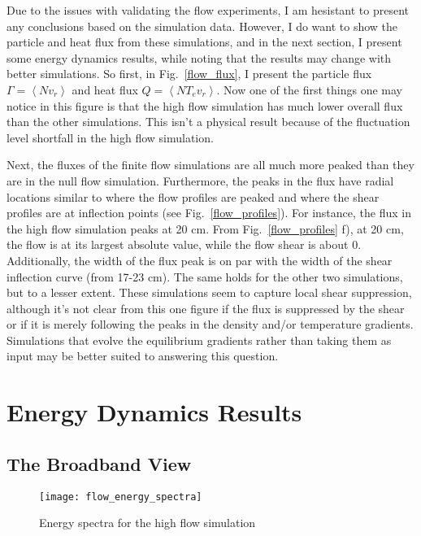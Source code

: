 Due to the issues with validating the flow experiments, I am hesistant to present any conclusions based on the simulation data. However, I do want to show the particle and heat flux from these
simulations, and in the next section, I present some energy dynamics results, while noting that the results may change with better simulations. So first, in Fig.~\ref{flow_flux}, I present
the particle flux $\Gamma = \left< N v_r \right>$ and heat flux $Q = \left< N T_e v_r \right> $. Now one of the first things one may notice in this figure is that the high flow simulation has
much lower overall flux than the other simulations. This isn't a physical result because of the fluctuation level shortfall in the high flow simulation.

Next, the fluxes of the finite flow simulations are all much more peaked than they are in the null flow simulation. Furthermore, the peaks in the flux have radial locations similar to
where the flow profiles are peaked and where the shear profiles are at inflection points (see Fig.~\ref{flow_profiles}). For instance, the flux in the high flow simulation peaks at 20 cm.
From Fig.~\ref{flow_profiles} f), at 20 cm, the flow is at its largest absolute value, while the flow shear is about 0. Additionally, the width of the flux peak is on par with the width
of the shear inflection curve (from 17-23 cm). The same holds for the other two simulations, but to a lesser extent. These simulations seem to capture local shear suppression, although it's
not clear from this one figure if the flux is suppressed by the shear or if it is merely following the peaks in the density and/or temperature gradients. Simulations that evolve the equilibrium
gradients rather than taking them as input may be better suited to answering this question.

\section{Energy Dynamics Results}
\label{s_flow_en_dyn}

\subsection{The Broadband View}
\label{ss_broad_view}

\begin{figure}
\centerline{\texttt{[image: flow\_energy\_spectra]}}
\caption{Energy spectra for the high flow simulation}
\label{flow_energy_spectra}
\end{figure}

